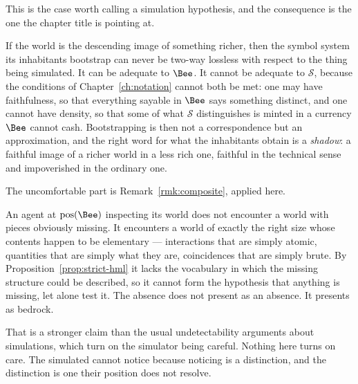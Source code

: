 \begin{remark}
\label{rmk:sim-approx}
This is the case worth calling a simulation hypothesis, and the
consequence is the one the chapter title is pointing at.

If the world is the descending image of something richer, then the
symbol system its inhabitants bootstrap can never be two-way lossless
with respect to the thing being simulated.
It can be adequate to $\Bee$.
It cannot be adequate to $\mathcal{S}$, because the conditions of
Chapter~\ref{ch:notation} cannot both be met: one may have faithfulness,
so that everything sayable in $\Bee$ says something distinct, and one
cannot have density, so that some of what $\mathcal{S}$ distinguishes is
minted in a currency $\Bee$ cannot cash.
Bootstrapping is then not a correspondence but an approximation, and the
right word for what the inhabitants obtain is a \emph{shadow}: a faithful
image of a richer world in a less rich one, faithful in the technical
sense and impoverished in the ordinary one.
\end{remark}

\begin{remark}
\label{rmk:sim-undetectable}
The uncomfortable part is Remark~\ref{rmk:composite}, applied here.

An agent at $\mathrm{pos}(\Bee)$ inspecting its world does not encounter
a world with pieces obviously missing.
It encounters a world of exactly the right size whose contents happen to
be elementary --- interactions that are simply atomic, quantities that are
simply what they are, coincidences that are simply brute.
By Proposition~\ref{prop:strict-hml} it lacks the vocabulary in which the
missing structure could be described, so it cannot form the hypothesis
that anything is missing, let alone test it.
The absence does not present as an absence.
It presents as bedrock.

That is a stronger claim than the usual undetectability arguments about
simulations, which turn on the simulator being careful.
Nothing here turns on care.
The simulated cannot notice because noticing is a distinction, and the
distinction is one their position does not resolve.
\end{remark}

